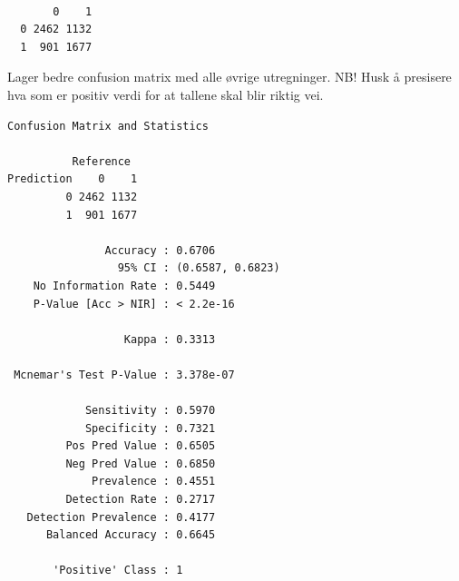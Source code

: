 \documentclass[
  letterpaper,
  DIV=11,
  numbers=noendperiod]{scrreprt}
\newenvironment{Shaded}{\begin{snugshade}}{\end{snugshade}}
\newcommand{\AttributeTok}[1]{\textcolor[rgb]{0.40,0.45,0.13}{#1}}
\newcommand{\FunctionTok}[1]{\textcolor[rgb]{0.28,0.35,0.67}{#1}}
\newcommand{\NormalTok}[1]{\textcolor[rgb]{0.00,0.23,0.31}{#1}}
\newcommand{\SpecialCharTok}[1]{\textcolor[rgb]{0.37,0.37,0.37}{#1}}
\newcommand{\StringTok}[1]{\textcolor[rgb]{0.13,0.47,0.30}{#1}}
\theoremstyle{definition}
\theoremstyle{remark}
\begin{document}
\begin{Shaded}
\end{Shaded}

\begin{verbatim}
   
       0    1
  0 2462 1132
  1  901 1677
\end{verbatim}

Lager bedre confusion matrix med alle øvrige utregninger. NB! Husk å
presisere hva som er positiv verdi for at tallene skal blir riktig vei.

\begin{Shaded}
\end{Shaded}

\begin{verbatim}
Confusion Matrix and Statistics

          Reference
Prediction    0    1
         0 2462 1132
         1  901 1677
                                          
               Accuracy : 0.6706          
                 95% CI : (0.6587, 0.6823)
    No Information Rate : 0.5449          
    P-Value [Acc > NIR] : < 2.2e-16       
                                          
                  Kappa : 0.3313          
                                          
 Mcnemar's Test P-Value : 3.378e-07       
                                          
            Sensitivity : 0.5970          
            Specificity : 0.7321          
         Pos Pred Value : 0.6505          
         Neg Pred Value : 0.6850          
             Prevalence : 0.4551          
         Detection Rate : 0.2717          
   Detection Prevalence : 0.4177          
      Balanced Accuracy : 0.6645          
                                          
       'Positive' Class : 1               
                                          
\end{verbatim}
\end{document}
